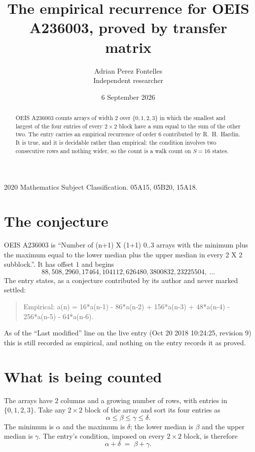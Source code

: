 \documentclass[11pt,a4paper]{article}
\title{The empirical recurrence for OEIS A236003, proved by transfer matrix}
\author{Adrian Perez Fontelles\\ \small Independent researcher}
\date{6 September 2026}
\theoremstyle{plain}
\theoremstyle{definition}
\begin{document}
\maketitle

\begin{abstract}
OEIS A236003 counts arrays of width $2$ over $\{0,1,2,3\}$ in which the smallest and largest of the
four entries of every $2\times2$ block have a sum equal to the sum of the other two. The entry
carries an empirical recurrence of order $6$ contributed by R.~H.~Hardin. It is true, and
it is decidable rather than empirical: the condition involves two consecutive rows and nothing
wider, so the count is a walk count on $S=16$ states.
\end{abstract}

\noindent\small 2020 Mathematics Subject Classification. 05A15, 05B20, 15A18.\normalsize

\section{The conjecture}

OEIS A236003 is ``Number of (n+1) X (1+1) 0..3 arrays with the minimum plus the maximum equal to the lower median plus the upper median in every 2 X 2 subblock.''. It has offset $1$ and begins
\[
88, 508, 2960, 17464, 104112, 626480, 3800832, 23225504,\ \dots
\]
The entry states, as a conjecture contributed by its author and never marked settled:
\begin{quote}
Empirical: a(n) = 16*a(n-1) - 86*a(n-2) + 156*a(n-3) + 48*a(n-4) - 256*a(n-5) - 64*a(n-6).
\end{quote}
As of the ``Last modified'' line on the live entry (Oct 20 2018 10:24:25, revision 9) this is still
recorded as empirical, and nothing on the entry records it as proved.

\section{What is being counted}

The arrays have $2$ columns and a growing number of rows, with entries in $\{0,1,2,3\}$. Take any
$2\times2$ block of the array and sort its four entries as
\[
\alpha\le\beta\le\gamma\le\delta .
\]
The minimum is $\alpha$ and the maximum is $\delta$; the lower median is $\beta$ and the upper
median is $\gamma$. The entry's condition, imposed on every $2\times2$ block, is therefore
\[
\alpha+\delta\;=\;\beta+\gamma .
\]
\end{document}
